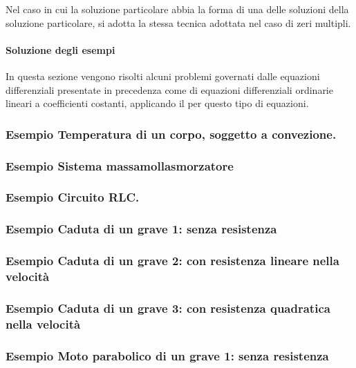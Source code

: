 \documentclass[letterpaper,10pt,italian]{jupyterBook}
\begin{document}
\sphinxAtStartPar
Nel caso in cui la soluzione particolare abbia la forma di una delle soluzioni della soluzione particolare, si adotta la stessa tecnica adottata nel caso di zeri multipli.


\paragraph{Soluzione degli esempi}
\label{\detokenize{ch/ode:soluzione-degli-esempi}}\label{\detokenize{ch/ode:ode-hs-types-linear-const-ex-sol}}
\sphinxAtStartPar
In questa sezione vengono risolti alcuni problemi governati dalle equazioni differenziali presentate in precedenza come {\hyperref[\detokenize{ch/ode:ode-hs-types-linear-const-ex}]{}} di equazioni differenziali ordinarie lineari a coefficienti costanti, applicando il {\hyperref[\detokenize{ch/ode:ode-hs-types-linear-const-sol}]{}} per questo tipo di equazioni.
\subsubsection*{Esempio \sphinxhyphen{} Temperatura di un corpo, soggetto a convezione.}
\subsubsection*{Esempio \sphinxhyphen{} Sistema massa\sphinxhyphen{}molla\sphinxhyphen{}smorzatore}
\subsubsection*{Esempio \sphinxhyphen{} Circuito RLC. }
\subsubsection*{Esempio \sphinxhyphen{} Caduta di un grave \sphinxhyphen{} 1: senza resistenza}
\subsubsection*{Esempio \sphinxhyphen{} Caduta di un grave \sphinxhyphen{} 2: con resistenza lineare nella velocità}
\subsubsection*{Esempio \sphinxhyphen{} Caduta di un grave \sphinxhyphen{} 3: con resistenza quadratica nella velocità}
\subsubsection*{Esempio \sphinxhyphen{} Moto parabolico di un grave \sphinxhyphen{} 1: senza resistenza}
\end{document}
